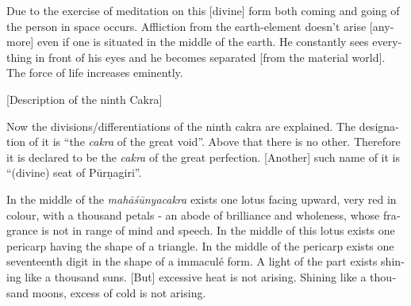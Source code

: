 \begin{otherlanguage}{english}
\begin{tlate}
    \end{tlate}
  \begin{tlate}
 Due to the exercise of meditation on this [divine] form both coming and going of the person in space occurs. Affliction from the earth-element doesn't arise [anymore] even if one is situated in the middle of the earth. He constantly sees everything in front of his eyes and he becomes separated [from the material world]. The force of life increases eminently.    
     \end{tlate}
       \bigskip
    \centerline{\textrm{\small{[Description of the ninth Cakra]}}}
    \bigskip
    \begin{tlate}
Now the divisions/differentiations of the ninth cakra are explained. The designation of it is ``the \textit{cakra} of the great void''. Above that there is no other. Therefore it is declared to be the \textit{cakra} of the great perfection. [Another] such name of it is ``(divine) seat of Pūrṇagiri''. 
    \end{tlate}
  \begin{tlate}
 In the middle of the \textit{mahāśūnyacakra} exists one lotus facing upward, very red in colour, with a thousand petals - an abode of brilliance and wholeness, whose fragrance is not in range of mind and speech. In the middle of this lotus exists one pericarp having the shape of a triangle. In the middle of the pericarp exists one seventeenth digit in the shape of a immaculé form. A light of the part exists shining like a thousand suns. [But] excessive heat is not arising. Shining like a thousand moons, excess of cold is not arising.
  \end{tlate}
     \begin{tlate}

\end{tlate}
\end{otherlanguage}
